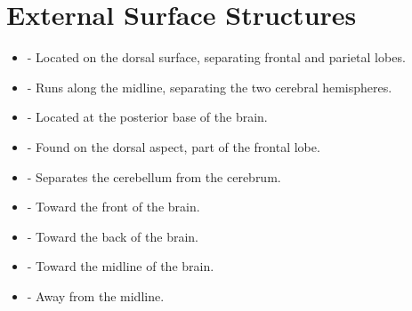 \section*{External Surface Structures}
\begin{itemize}
    \item {} - Located on the dorsal surface, separating frontal and parietal lobes.
    \item {} - Runs along the midline, separating the two cerebral hemispheres.
    \item {} - Located at the posterior base of the brain.
    \item {} - Found on the dorsal aspect, part of the frontal lobe.
    \item {} - Separates the cerebellum from the cerebrum.
    \item {} - Toward the front of the brain.
    \item {} - Toward the back of the brain.
    \item {} - Toward the midline of the brain.
    \item {} - Away from the midline.
\end{itemize}

